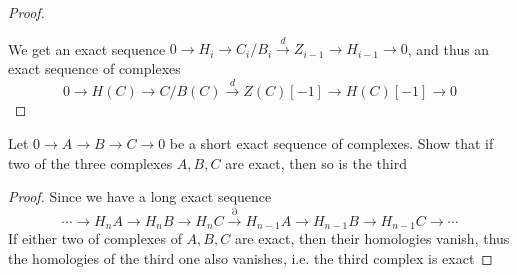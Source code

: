 \documentclass{article}
\newenvironment{exercise}[2][Exercise]{\begin{trivlist}
\item[\hskip \labelsep {\bfseries #1}\hskip \labelsep {\bfseries #2.}]}{\end{trivlist}}
\theoremstyle{definition}
\theoremstyle{remark}
\theoremstyle{definition}
\begin{document}
\begin{proof}
\begin{center}
\fi
{}
\end{center}
We get an exact sequence $0\to H_i\to C_i/B_i\xrightarrow{d} Z_{i-1}\to H_{i-1}\to0$, and thus an exact sequence of complexes
\[0\to H(C)\to C/B(C)\xrightarrow{d}Z(C)[-1]\to H(C)[-1]\to0\]
\end{proof}

\begin{exercise}{\textbf{1.3.1}}
Let $0\to A\to B\to C\to 0$ be a short exact sequence of complexes. Show that if two of the three complexes $A,B,C$ are exact, then so is the third
\end{exercise}

\begin{proof}
Since we have a long exact sequence
\[\cdots\to H_nA\to H_nB\to H_nC\xrightarrow{\partial}H_{n-1}A\to H_{n-1}B\to H_{n-1}C\to\cdots\]
If either two of complexes of $A,B,C$ are exact, then their homologies vanish, thus the homologies of the third one also vanishes, i.e. the third complex is exact
\end{proof}
\end{document}
